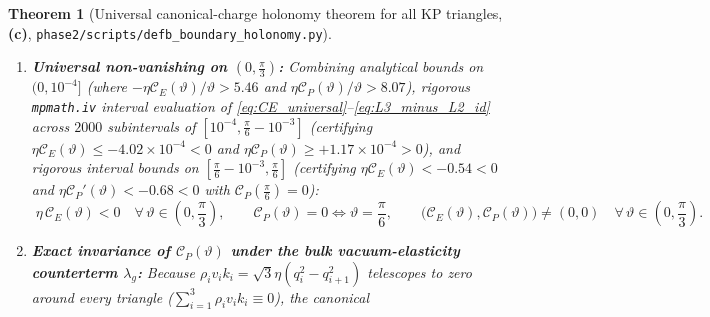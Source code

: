\documentclass[11pt,a4paper]{article}
\newtheorem{theorem}{Theorem}[section]
\theoremstyle{remark}
\newcommand{\Lc}{\textbf{(c)}}
\newcommand{\shol}{\texttt{phase2/\allowbreak scripts/\allowbreak defb\_\allowbreak boundary\_\allowbreak holonomy.py}}
\begin{document}
\begin{theorem}[Universal canonical-charge holonomy theorem for all KP triangles, \Lc, \shol]
\begin{enumerate}
For all $\vartheta \in (0,\frac{\pi}{3})$, the difference of the cusp logarithms
$L_2 := \ln\frac{\sqrt{3}+2k_2}{\sqrt{3}-2k_2}$ and
$L_3 := \ln\frac{2k_3+\sqrt{3}}{2k_3-\sqrt{3}}$ obeys the exact singularity-free
identity
\begin{equation}\label{eq:L3_minus_L2_id}
  L_3(\vartheta) - L_2(\vartheta)
  \equiv \ln\!\left(\frac{2k_3 + \sqrt{3}}{\sqrt{3} + 2k_2}\cdot
         \frac{1 + \sqrt{3}\tan(\vartheta/2)}{1 - \sqrt{3}\tan(\vartheta/2)}\right),
\end{equation}
and as $\vartheta \to 0^+$ (and symmetrically as $\vartheta \to (\frac{\pi}{3})^-$),
\begin{equation}\label{eq:CE_CP_asympt}
  \mathcal{C}_E(\vartheta) = -\frac{3\eta}{2\pi}\,\vartheta\!\left(\ln\frac{2\sqrt{3}}{\vartheta} + 1\right) + O(\vartheta^2\ln\vartheta), \qquad
  \mathcal{C}_P(\vartheta) = +\frac{3\eta}{\pi}\,\vartheta\!\left(\ln\frac{2\sqrt{3}}{\vartheta} - 2\right) + O(\vartheta^2\ln\vartheta).
\end{equation}
\item \textbf{Universal non-vanishing on $(0,\frac{\pi}{3})$:}
Combining analytical bounds on $(0,10^{-4}]$ (where
$-\eta\mathcal{C}_E(\vartheta)/\vartheta > 5.46$ and
$\eta\mathcal{C}_P(\vartheta)/\vartheta > 8.07$), rigorous \texttt{mpmath.iv}
interval evaluation of \eqref{eq:CE_universal}--\eqref{eq:L3_minus_L2_id} across
$2000$ subintervals of $[10^{-4},\frac{\pi}{6}-10^{-3}]$ (certifying
$\eta\mathcal{C}_E(\vartheta) \le -4.02\times 10^{-4} < 0$ and
$\eta\mathcal{C}_P(\vartheta) \ge +1.17\times 10^{-4} > 0$), and rigorous
interval bounds on $[\frac{\pi}{6}-10^{-3},\frac{\pi}{6}]$ (certifying
$\eta\mathcal{C}_E(\vartheta) < -0.54 < 0$ and
$\eta\mathcal{C}_P'(\vartheta) < -0.68 < 0$ with $\mathcal{C}_P(\frac{\pi}{6})=0$):
\begin{equation}\label{eq:universal_nogo_ineq}
  \boxed{\;
  \eta\,\mathcal{C}_E(\vartheta) < 0 \quad \forall\,\vartheta \in \left(0,\frac{\pi}{3}\right), \qquad
  \mathcal{C}_P(\vartheta) = 0 \iff \vartheta = \frac{\pi}{6}, \qquad
  \big(\mathcal{C}_E(\vartheta),\mathcal{C}_P(\vartheta)\big) \ne (0,0) \quad \forall\,\vartheta \in \left(0,\frac{\pi}{3}\right).
  \;}
\end{equation}
\item \textbf{Exact invariance of $\mathcal{C}_P(\vartheta)$ under the bulk
vacuum-elasticity counterterm $\lambda_g$:}
Because $\rho_i v_i k_i = \sqrt{3}\eta(q_i^2 - q_{i+1}^2)$ telescopes to zero
around every triangle ($\sum_{i=1}^3 \rho_i v_i k_i \equiv 0$), the canonical

\end{enumerate}
\end{theorem}
\end{document}
